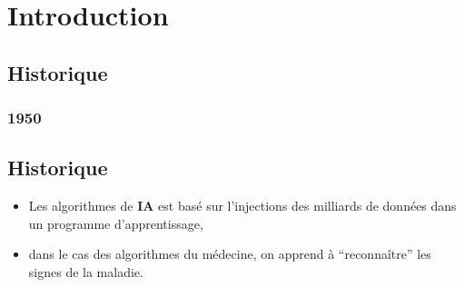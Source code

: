 \pagestyle{monstyle}\setcounter{page}{1}
\chapter{Introduction}
\vspace{2cm}
\section{Historique}
\vspace{-1cm}
\subsection{1950}
\vspace{-1cm}

\section{Historique}

\begin{itemize}
\item
Les algorithmes de \textbf{IA} est basé sur  l'injections des milliards de données
dans un programme d'apprentissage,
\item
dans le cas des algorithmes du médecine, on apprend à ``reconnaître'' les signes
de la maladie.
\end{itemize}
